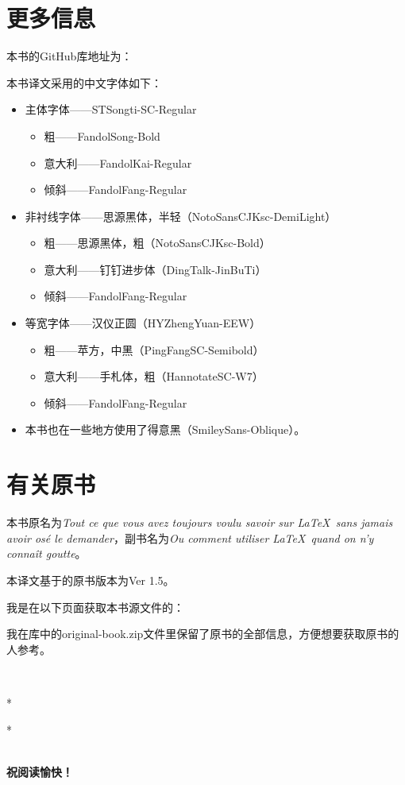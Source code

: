 \section*{更多信息}

本书的GitHub库地址为：

\begin{center}
\end{center}

本书译文采用的中文字体如下：

\begin{itemize}
    \item 主体字体——STSongti-SC-Regular
    \begin{itemize}
        \item 粗——FandolSong-Bold
        \item 意大利——FandolKai-Regular
        \item 倾斜——FandolFang-Regular
    \end{itemize}
    \item 非衬线字体——思源黑体，半轻（NotoSansCJKsc-DemiLight）
    \begin{itemize}
        \item 粗——思源黑体，粗（NotoSansCJKsc-Bold）
        \item 意大利——钉钉进步体（DingTalk-JinBuTi）
        \item 倾斜——FandolFang-Regular
    \end{itemize}
    \item 等宽字体——汉仪正圆（HYZhengYuan-EEW）
    \begin{itemize}
        \item 粗——苹方，中黑（PingFangSC-Semibold）
        \item 意大利——手札体，粗（HannotateSC-W7）
        \item 倾斜——FandolFang-Regular
    \end{itemize}
    \item 本书也在一些地方使用了得意黑（SmileySans-Oblique）。
\end{itemize}

\section*{有关原书}

本书原名为\emph{Tout ce que vous avez toujours voulu savoir sur \LaTeX \ sans jamais avoir osé le demander}，副书名为\emph{Ou comment utiliser \LaTeX \ quand on n'y connaît goutte}。

本译文基于的原书版本为Ver 1.5。

我是在以下页面获取本书源文件的：

\begin{center}
\end{center}

我在库中的original-book.zip文件里保留了原书的全部信息，方便想要获取原书的人参考。

~\\

\begin{center}
    *

    *\quad *

    ~\\

    \textbf{祝阅读愉快！}
\end{center}